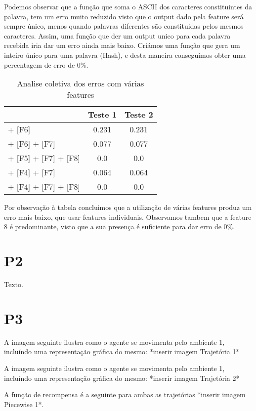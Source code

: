 \documentclass[11pt,twocolumn]{article}
\begin{document}
    Podemos observar que a função que soma o ASCII dos caracteres
    constituintes da palavra, tem um erro muito reduzido visto que o output dado pela feature será sempre único, menos quando palavras diferentes são constituidas pelos mesmos caracteres. 
    Assim, uma função que der um output unico para cada palavra recebida iria dar um erro ainda mais baixo. Criámos uma função que gera um inteiro único para uma palavra (Hash), e desta maneira conseguimos obter uma percentagem de erro de 0\%.
    
    \begin{table}[htbp]
        \centering
        \caption{Analise coletiva dos erros com várias features}
        \label{my-label}
        \begin{tabular}{|l|c|c|}
        \hline
        \multicolumn{1}{|r|}{}                                      & \textbf{Teste 1} & \textbf{Teste 2}                    \\ \hline
        [F5] + [F6] & 0.231 & 0.231 \\ \hline
        [F5] + [F6] + [F7]     & 0.077  & 0.077                   \\ \hline
        [F4] + [F5] + [F7] + [F8]   & 0.0              & 0.0                                 \\ \hline
        [F3] + [F4] + [F7]   & 0.064             & 0.064                                 \\ \hline
        [F3] + [F4] + [F7] + [F8]   & 0.0          & 0.0                                 \\ \hline
        \end{tabular}
        \end{table}
    \par  
    Por observação à tabela concluimos que a utilização de várias features produz um erro mais baixo, que usar features individuais. 
    Observamos tambem que a feature 8 é predominante, visto que a sua presença é suficiente para dar erro de 0\%.

\section*{P2}

Texto.

\section*{P3}

A imagem seguinte ilustra como o agente se movimenta pelo ambiente 1, incluíndo uma representação gráfica do mesmo:
	*inserir imagem Trajetória 1*

A imagem seguinte ilustra como o agente se movimenta pelo ambiente 1, incluíndo uma representação gráfica do mesmo:
	*inserir imagem Trajetória 2*

A função de recompensa é a seguinte para ambas as trajetórias *inserir imagem Piecewise 1*.\par
\end{document}
